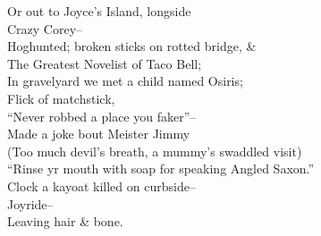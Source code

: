 Or out to Joyce's Island, longside \\
Crazy Corey-- \\
Hoghunted; broken sticks on rotted bridge, \& \\
The Greatest Novelist of Taco Bell; \\ 
In gravelyard we met a child named Osiris; \\
Flick of matchstick, \\
``Never robbed a place you faker''-- \\
Made a joke bout Meister Jimmy \\
(Too much devil's breath, a mummy's swaddled visit) \\
``Rinse yr mouth with soap for speaking Angled Saxon.'' \\
Clock a kayoat killed on curbside-- \\
Joyride-- \\
Leaving hair \& bone.